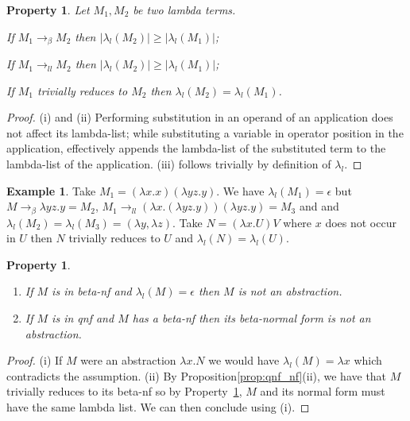 \documentclass{elsarticle}
\theoremstyle{plain}
\newtheorem{property}[theorem]{Property}
\theoremstyle{definition}
\newtheorem{example}{Example}[section]
\theoremstyle{remark}
\newcommand{\llred}{\rightarrow_{ll}}
\begin{document}

\begin{property}
\label{property:lambdalist_linearred}
    Let $M_1, M_2$ be two lambda terms.
    \begin{enumerate*}[noitemsep,label=(\roman*)]
        \item If $M_1 \rightarrow_\beta M_2$ then $|\lambda_l(M_2)| \geq
        |\lambda_l(M_1)|$;
        \item If $M_1 \llred M_2$ then $|\lambda_l(M_2)| \geq
        |\lambda_l(M_1)|$;
        \item If $M_1$ trivially reduces to $M_2$ then $\lambda_l(M_2) =
        \lambda_l(M_1)$.
    \end{enumerate*}
\end{property}
\begin{proof}
    (i) and (ii) Performing substitution in an operand of an application does not affect its lambda-list; while substituting a variable in operator position in the application, effectively appends the lambda-list of the substituted term to the lambda-list of the application.
    (iii) follows trivially by definition of $\lambda_l$.
\end{proof}
\begin{example}
Take $M_1 = (\lambda x . x) (\lambda y z . y)$. We have $\lambda_l(M_1) = \epsilon$ but $M \rightarrow_\beta \lambda y z . y = M_2$,
$M_1 \llred (\lambda x . (\lambda y z . y)) (\lambda y z . y) = M_3$ and
and $\lambda_l(M_2) = \lambda_l(M_3) = (\lambda y, \lambda z)$.
Take $N = (\lambda x . U) V$ where $x$ does not occur in $U$ then $N$ trivially reduces to $U$ and $\lambda_l(N) = \lambda_l(U)$.
\end{example}

\begin{property}
\label{prop:qnf_betanf_empty_lambdalist}
    \begin{enumerate}[noitemsep,label=(\roman*)]
    \item If $M$ is in beta-nf and $\lambda_l(M) = \epsilon$ then $M$ is not an abstraction.
    \item If $M$ is in \emph{qnf} and $M$ has a beta-nf then its beta-normal form is not an abstraction.
    \end{enumerate}
\end{property}
\begin{proof}
(i) If $M$ were an abstraction $\lambda x. N$ we would have $\lambda_l(M) = \lambda x$ which contradicts the assumption.
(ii) By Proposition\ref{prop:qnf_nf}(ii), we have that $M$ trivially reduces to
its beta-nf so by Property~\ref{property:lambdalist_linearred},
$M$ and its normal form must have the same lambda list. We can then conclude using (i).
\end{proof}
\end{document}

